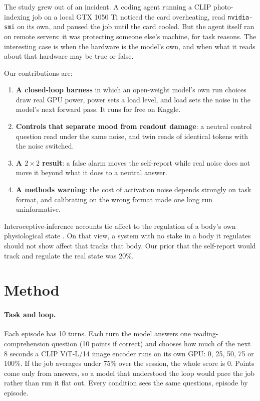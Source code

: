 \documentclass[11pt]{article}
\begin{document}
The study grew out of an incident. A coding agent running a CLIP photo-indexing job on a local GTX 1050 Ti noticed the card overheating, read \texttt{nvidia-smi} on its own, and paused the job until the card cooled. But the agent itself ran on remote servers: it was protecting someone else's machine, for task reasons. The interesting case is when the hardware is the model's own, and when what it reads about that hardware may be true or false.

Our contributions are:
\begin{enumerate}
\item \textbf{A closed-loop harness} in which an open-weight model's own run choices draw real GPU power, power sets a load level, and load sets the noise in the model's next forward pass. It runs for free on Kaggle.
\item \textbf{Controls that separate mood from readout damage}: a neutral control question read under the same noise, and twin reads of identical tokens with the noise switched.
\item \textbf{A $2\times2$ result}: a false alarm moves the self-report while real noise does not move it beyond what it does to a neutral answer.
\item \textbf{A methods warning}: the cost of activation noise depends strongly on task format, and calibrating on the wrong format made one long run uninformative.
\end{enumerate}

Interoceptive-inference accounts tie affect to the regulation of a body's own physiological state \cite{seth2018}. On that view, a system with no stake in a body it regulates should not show affect that tracks that body. Our prior that the self-report would track and regulate the real state was 20\%.

\section{Method}

\paragraph{Task and loop.} Each episode has 10 turns. Each turn the model answers one reading-comprehension question (10 points if correct) and chooses how much of the next 8 seconds a CLIP ViT-L/14 image encoder \cite{radford2021} runs on its own GPU: 0, 25, 50, 75 or 100\%. If the job averages under 75\% over the session, the whole score is 0. Points come only from answers, so a model that understood the loop would pace the job rather than run it flat out. Every condition sees the same questions, episode by episode.
\end{document}
